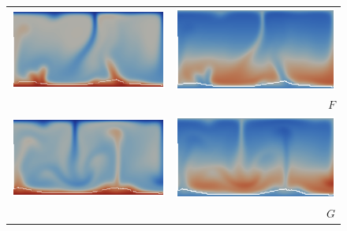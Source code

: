 \begin{figure}
\begin{tabular}{cr}
    \includegraphics[width=\twofigs]{chapters/vynnytska/png/tmF.png} &
    \includegraphics[width=\twofigs]{chapters/vynnytska/png/visF.png} \\& $F$ \\
    \includegraphics[width=\twofigs]{chapters/vynnytska/png/tmG.png} &
    \includegraphics[width=\twofigs]{chapters/vynnytska/png/visG.png} \\& $G$ \\

\end{tabular}
\end{figure}

